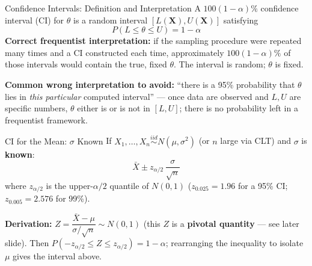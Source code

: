 \documentclass[11pt,aspectratio=169]{beamer}
\newcommand{\Xbar}{\bar{X}}
\begin{document}
\begin{frame}{Confidence Intervals: Definition and Interpretation}
A $100(1-\alpha)\%$ confidence interval (CI) for $\theta$ is a random
interval $[L(\mathbf X), U(\mathbf X)]$ satisfying
\[
    P(L \le \theta \le U) = 1-\alpha
\]
\textbf{Correct frequentist interpretation:} if the sampling procedure were
repeated many times and a CI constructed each time, approximately
$100(1-\alpha)\%$ of those intervals would contain the true, fixed
$\theta$. The interval is random; $\theta$ is fixed.

\textbf{Common wrong interpretation to avoid:} ``there is a 95\% probability
that $\theta$ lies in \emph{this particular} computed interval'' — once
data are observed and $L,U$ are specific numbers, $\theta$ either is or is
not in $[L,U]$; there is no probability left in a frequentist framework.
\end{frame}

\begin{frame}{CI for the Mean: $\sigma$ Known}
If $X_1,\dots,X_n\stackrel{iid}\sim N(\mu,\sigma^2)$ (or $n$ large via CLT)
and $\sigma$ is \textbf{known}:
\[
    \Xbar \pm z_{\alpha/2}\,\frac{\sigma}{\sqrt n}
\]
where $z_{\alpha/2}$ is the upper-$\alpha/2$ quantile of $N(0,1)$
($z_{0.025}=1.96$ for a 95\% CI; $z_{0.005}=2.576$ for 99\%).

\textbf{Derivation:} $Z=\dfrac{\Xbar-\mu}{\sigma/\sqrt n}\sim N(0,1)$
(this $Z$ is a \textbf{pivotal quantity} — see later slide). Then
$P(-z_{\alpha/2}\le Z\le z_{\alpha/2})=1-\alpha$; rearranging the inequality
to isolate $\mu$ gives the interval above.
\end{frame}
\end{document}
